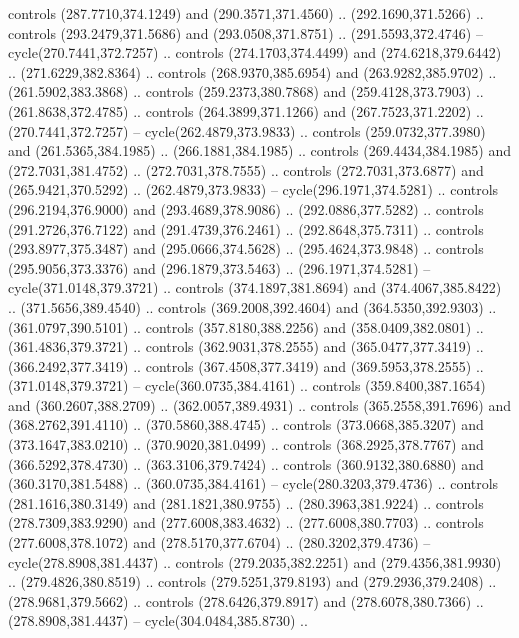 \begin{scope}[cm={{1.25,0.0,0.0,-1.25,(0.0,743.43331)}}]
    controls (287.7710,374.1249) and (290.3571,371.4560) .. (292.1690,371.5266) ..
    controls (293.2479,371.5686) and (293.0508,371.8751) .. (291.5593,372.4746) --
    cycle(270.7441,372.7257) .. controls (274.1703,374.4499) and
    (274.6218,379.6442) .. (271.6229,382.8364) .. controls (268.9370,385.6954) and
    (263.9282,385.9702) .. (261.5902,383.3868) .. controls (259.2373,380.7868) and
    (259.4128,373.7903) .. (261.8638,372.4785) .. controls (264.3899,371.1266) and
    (267.7523,371.2202) .. (270.7441,372.7257) -- cycle(262.4879,373.9833) ..
    controls (259.0732,377.3980) and (261.5365,384.1985) .. (266.1881,384.1985) ..
    controls (269.4434,384.1985) and (272.7031,381.4752) .. (272.7031,378.7555) ..
    controls (272.7031,373.6877) and (265.9421,370.5292) .. (262.4879,373.9833) --
    cycle(296.1971,374.5281) .. controls (296.2194,376.9000) and
    (293.4689,378.9086) .. (292.0886,377.5282) .. controls (291.2726,376.7122) and
    (291.4739,376.2461) .. (292.8648,375.7311) .. controls (293.8977,375.3487) and
    (295.0666,374.5628) .. (295.4624,373.9848) .. controls (295.9056,373.3376) and
    (296.1879,373.5463) .. (296.1971,374.5281) -- cycle(371.0148,379.3721) ..
    controls (374.1897,381.8694) and (374.4067,385.8422) .. (371.5656,389.4540) ..
    controls (369.2008,392.4604) and (364.5350,392.9303) .. (361.0797,390.5101) ..
    controls (357.8180,388.2256) and (358.0409,382.0801) .. (361.4836,379.3721) ..
    controls (362.9031,378.2555) and (365.0477,377.3419) .. (366.2492,377.3419) ..
    controls (367.4508,377.3419) and (369.5953,378.2555) .. (371.0148,379.3721) --
    cycle(360.0735,384.4161) .. controls (359.8400,387.1654) and
    (360.2607,388.2709) .. (362.0057,389.4931) .. controls (365.2558,391.7696) and
    (368.2762,391.4110) .. (370.5860,388.4745) .. controls (373.0668,385.3207) and
    (373.1647,383.0210) .. (370.9020,381.0499) .. controls (368.2925,378.7767) and
    (366.5292,378.4730) .. (363.3106,379.7424) .. controls (360.9132,380.6880) and
    (360.3170,381.5488) .. (360.0735,384.4161) -- cycle(280.3203,379.4736) ..
    controls (281.1616,380.3149) and (281.1821,380.9755) .. (280.3963,381.9224) ..
    controls (278.7309,383.9290) and (277.6008,383.4632) .. (277.6008,380.7703) ..
    controls (277.6008,378.1072) and (278.5170,377.6704) .. (280.3202,379.4736) --
    cycle(278.8908,381.4437) .. controls (279.2035,382.2251) and
    (279.4356,381.9930) .. (279.4826,380.8519) .. controls (279.5251,379.8193) and
    (279.2936,379.2408) .. (278.9681,379.5662) .. controls (278.6426,379.8917) and
    (278.6078,380.7366) .. (278.8908,381.4437) -- cycle(304.0484,385.8730) ..

\end{scope}
